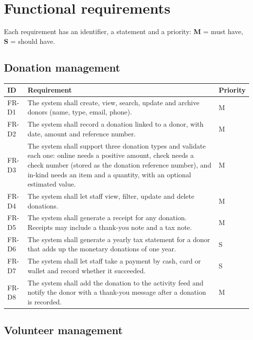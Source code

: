 \section{Functional requirements}

Each requirement has an identifier, a statement and a priority: \textbf{M} = must have, \textbf{S} = should have.

\subsection{Donation management}

\begin{center}
\footnotesize
\begin{tabularx}{\textwidth}{@{}L{0.09\textwidth}YL{0.11\textwidth}@{}}
\toprule
\textbf{ID} & \textbf{Requirement} & \textbf{Priority} \\
\midrule
FR-D1 & The system shall create, view, search, update and archive donors (name, type, email, phone). & M \\
FR-D2 & The system shall record a donation linked to a donor, with date, amount and reference number. & M \\
FR-D3 & The system shall support three donation types and validate each one: online needs a positive amount, check needs a check number (stored as the donation reference number), and in-kind needs an item and a quantity, with an optional estimated value. & M \\
FR-D4 & The system shall let staff view, filter, update and delete donations. & M \\
FR-D5 & The system shall generate a receipt for any donation. Receipts may include a thank-you note and a tax note. & M \\
FR-D6 & The system shall generate a yearly tax statement for a donor that adds up the monetary donations of one year. & S \\
FR-D7 & The system shall let staff take a payment by cash, card or wallet and record whether it succeeded. & S \\
FR-D8 & The system shall add the donation to the activity feed and notify the donor with a thank-you message after a donation is recorded. & M \\
\bottomrule
\end{tabularx}
\end{center}

\subsection{Volunteer management}

